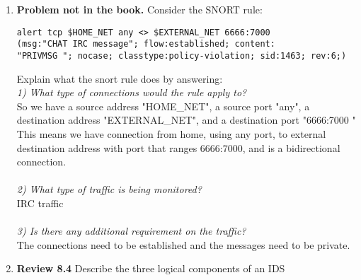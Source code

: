 \documentclass[12pt]{article}
\begin{document}
\renewcommand{\headrulewidth}{0.4pt}

\vspace{-3mm}

\begin{enumerate}

	\item {\textbf{Problem not in the book.}  Consider the SNORT rule:
	
	\begin{verbatim}
alert tcp $HOME_NET any <> $EXTERNAL_NET 6666:7000 
(msg:"CHAT IRC message"; flow:established; content:
"PRIVMSG "; nocase; classtype:policy-violation; sid:1463; rev:6;)
	\end{verbatim} }
	
Explain what the  snort rule does by answering:\\

\textit{1) What type of connections would the rule apply to?}\\ So we have a source address "HOME_NET", a source port "any", a destination address "EXTERNAL_NET", and a destination port  "6666:7000 " \\This means we have connection from home, using any port, to external destination address with port that ranges 6666:7000, and is a bidirectional connection.  \\\\
\textit{2) What type of traffic is being monitored?}\\ IRC traffic\\\\
\textit{3) Is there any additional requirement on the traffic? }\\The connections need to be established and the messages need to be private. 
		
	\vspace{10pt}

	\item {\textbf{Review 8.4} Describe the three logical components of an IDS} 
	

\end{enumerate}
\end{document}
